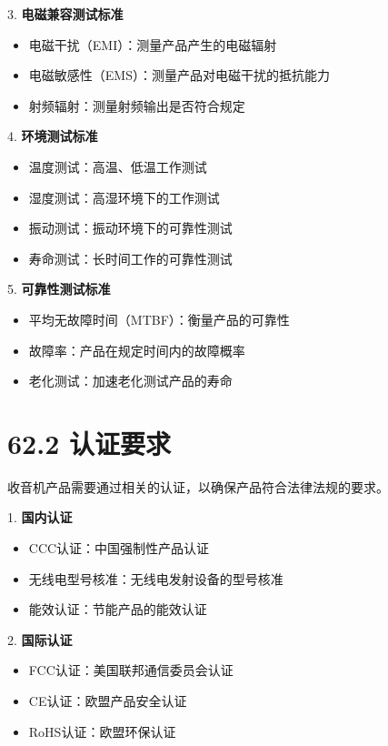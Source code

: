 \documentclass[12pt,UTF8]{ctexbook}
\begin{document}
3. \textbf{电磁兼容测试标准}
   \begin{itemize}[leftmargin=3.5em]
   \item 电磁干扰（EMI）：测量产品产生的电磁辐射
   \item 电磁敏感性（EMS）：测量产品对电磁干扰的抵抗能力
   \item 射频辐射：测量射频输出是否符合规定
   \end{itemize}

4. \textbf{环境测试标准}
   \begin{itemize}[leftmargin=3.5em]
   \item 温度测试：高温、低温工作测试
   \item 湿度测试：高湿环境下的工作测试
   \item 振动测试：振动环境下的可靠性测试
   \item 寿命测试：长时间工作的可靠性测试
   \end{itemize}

5. \textbf{可靠性测试标准}
   \begin{itemize}[leftmargin=3.5em]
   \item 平均无故障时间（MTBF）：衡量产品的可靠性
   \item 故障率：产品在规定时间内的故障概率
   \item 老化测试：加速老化测试产品的寿命
   \end{itemize}

\section*{62.2 认证要求}

收音机产品需要通过相关的认证，以确保产品符合法律法规的要求。

1. \textbf{国内认证}
   \begin{itemize}[leftmargin=3.5em]
   \item CCC认证：中国强制性产品认证
   \item 无线电型号核准：无线电发射设备的型号核准
   \item 能效认证：节能产品的能效认证
   \end{itemize}

2. \textbf{国际认证}
   \begin{itemize}[leftmargin=3.5em]
   \item FCC认证：美国联邦通信委员会认证
   \item CE认证：欧盟产品安全认证
   \item RoHS认证：欧盟环保认证
   \end{itemize}
\end{document}
